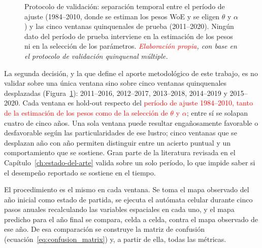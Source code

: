 \begin{figure}[htbp]
{}
  \caption{Protocolo de validación: separación temporal entre el período de ajuste (1984--2010, donde se estiman los pesos WoE y se eligen $\theta$ y $\alpha$) y las cinco ventanas quinquenales de prueba (2011--2020). Ningún dato del período de prueba interviene en la estimación de los pesos ni en la selección de los parámetros. \textit{\textcolor{red}{Elaboración propia}, con base en el protocolo de validación quinquenal múltiple.}}
  \label{fig:ventanas-validacion}
\end{figure}

La segunda decisión, y la que define el aporte metodológico de este trabajo, es no validar sobre una única ventana sino sobre cinco ventanas quinquenales desplazadas (Figura~\ref{fig:ventanas-validacion}): 2011--2016, 2012--2017, 2013--2018, 2014--2019 y 2015--2020. Cada ventana es hold-out respecto del \textcolor{red}{período de ajuste 1984--2010, tanto de la estimación de los pesos como de la selección de $\theta$ y $\alpha$}; entre sí se solapan cuatro de cinco años. Una sola ventana puede resultar engañosamente favorable o desfavorable según las particularidades de ese lustro; cinco ventanas que se desplazan año con año permiten distinguir entre un acierto puntual y un comportamiento que se sostiene. Gran parte de la literatura revisada en el Capítulo~\ref{ch:estado-del-arte} valida sobre un solo período, lo que impide saber si el desempeño reportado se sostiene en el tiempo.

El procedimiento es el mismo en cada ventana. Se toma el mapa observado del año inicial como estado de partida, se ejecuta el autómata celular durante cinco pasos anuales recalculando las variables espaciales en cada uno, y el mapa predicho para el año final se compara, celda a celda, contra el mapa observado de ese año. De esa comparación se construye la matriz de confusión (ecuación~\ref{eq:confusion_matrix}) y, a partir de ella, todas las métricas.

